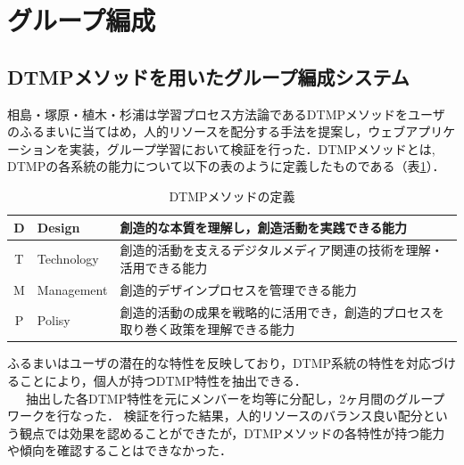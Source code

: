 \documentclass{funthesis}
\begin{document}
\section{グループ編成}

\subsection{DTMPメソッドを用いたグループ編成システム}

相島・塚原・植木・杉浦\cite{A5}は学習プロセス方法論であるDTMPメソッドをユーザのふるまいに当てはめ，人的リソースを配分する手法を提案し，ウェブアプリケーションを実装，グループ学習において検証を行った．DTMPメソッドとは,  DTMPの各系統の能力について以下の表のように定義したものである（表\ref{DTMP}）．

\begin{table}[h]
\begin{center}
  \caption{DTMPメソッドの定義}
  \begin{tabular}{|c|p{25mm}|p{105mm}|} \hline
    D & Design & 創造的な本質を理解し，創造活動を実践できる能力\tabularnewline \hline
    T & Technology & 
    創造的活動を支えるデジタルメディア関連の技術を理解・活用できる能力\tabularnewline \hline
    M &Management & 
    創造的デザインプロセスを管理できる能力\tabularnewline \hline
    P &Polisy &
    創造的活動の成果を戦略的に活用でき，創造的プロセスを取り巻く政策を理解できる能力\tabularnewline
    \hline
  \end{tabular}

  \label{DTMP}
  \end{center}
\end{table}

ふるまいはユーザの潜在的な特性を反映しており，DTMP系統の特性を対応づけることにより，個人が持つDTMP特性を抽出できる．\\
\ \ \  抽出した各DTMP特性を元にメンバーを均等に分配し，2ヶ月間のグループワークを行なった．
検証を行った結果，人的リソースのバランス良い配分という観点では効果を認めることができたが，DTMPメソッドの各特性が持つ能力や傾向を確認することはできなかった．
\end{document}
